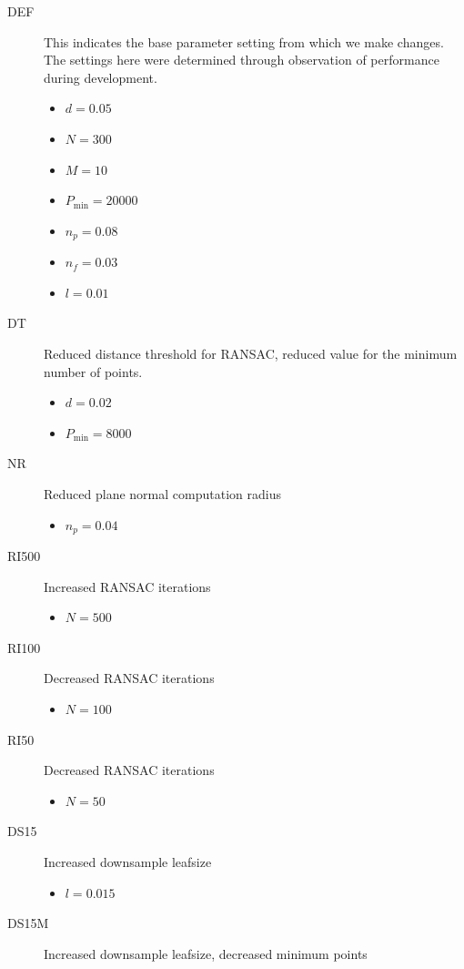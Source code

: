 \documentclass[11pt,a4paper]{kth-mag}
\begin{document}
\begin{description}
\item[DEF] This indicates the base parameter setting from which we make changes.
  The settings here were determined through observation of performance during
  development.
  \begin{itemize}
  \item $d=0.05$
  \item $N=300$
  \item $M=10$
  \item $P_{\min}=20000$
  \item $n_p=0.08$
  \item $n_f=0.03$
  \item $l=0.01$
  \end{itemize}
\item[DT] Reduced distance threshold for RANSAC, reduced value for the
  minimum number of points.
  \begin{itemize}
  \item $d=0.02$
  \item $P_{\min}=8000$
  \end{itemize}
\item[NR] Reduced plane normal computation radius
  \begin{itemize}
  \item $n_p=0.04$
  \end{itemize}
\item[RI500] Increased RANSAC iterations
  \begin{itemize}
  \item $N=500$
  \end{itemize}
\item[RI100] Decreased RANSAC iterations
  \begin{itemize}
  \item $N=100$
  \end{itemize}
\item[RI50] Decreased RANSAC iterations
  \begin{itemize}
  \item $N=50$
  \end{itemize}
\item[DS15] Increased downsample leafsize
  \begin{itemize}
  \item $l=0.015$
  \end{itemize}
\item[DS15M] Increased downsample leafsize, decreased minimum points
  \begin{itemize}

\end{itemize}
\end{description}
\end{document}
